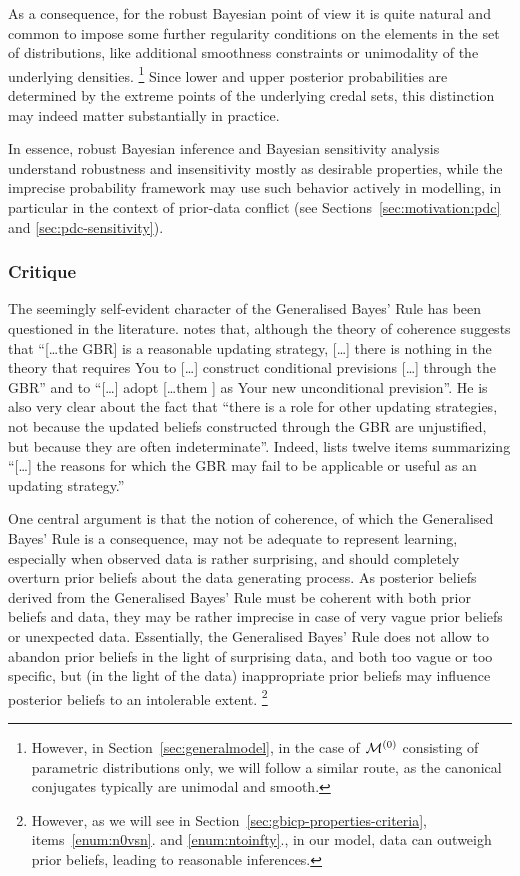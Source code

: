 As a consequence, for the robust Bayesian point of view it is quite natural and common
to impose some further regularity conditions on the elements in the set of distributions,
like additional smoothness constraints or unimodality of the underlying densities.%
\footnote{However, in Section~\ref{sec:generalmodel}, in the case of $\mathcal{M}^{(0)}$ consisting of parametric distributions only,
we will follow a similar route, as the canonical conjugates typically are unimodal and smooth.}
Since lower and upper posterior probabilities are determined by the extreme points of the underlying credal sets,
this distinction may indeed matter substantially in practice.

In essence, robust Bayesian inference and Bayesian sensitivity analysis
understand robustness and insensitivity mostly as desirable properties,
while the imprecise probability framework may use such behavior actively in modelling,
in particular in the context of prior-data conflict
(see Sections~\ref{sec:motivation:pdc} and \ref{sec:pdc-sensitivity}).

\subsubsection{Critique}
\label{sec:updating}

The seemingly self-evident character of the Generalised Bayes' Rule has been questioned in the literature.
\Textcite[p.~335]{1991:walley} notes that, although the theory of coherence suggests that
``[\ldots the GBR] is a reasonable updating strategy,
[\ldots] there is nothing in the theory that requires You to [\ldots] construct conditional previsions [\ldots] through the GBR''
and to ``[\ldots] adopt [\ldots them ] as Your new unconditional prevision''.
He is also very clear about the fact \parencite[see][p.~334]{1991:walley} that
``there is a role for other updating strategies, not because the updated beliefs constructed through the GBR are unjustified,
but because they are often indeterminate''.
Indeed, \textcite[\S 6.11.1]{1991:walley} lists twelve items summarizing
``[\ldots] the reasons for which the GBR may fail to be applicable or useful as an updating strategy.''

One central argument is that the notion of coherence, of which the Generalised Bayes' Rule is a consequence,
may not be adequate to represent learning, especially when observed data is rather surprising,
and should completely overturn prior beliefs about the data generating process.
As posterior beliefs derived from the Generalised Bayes' Rule must be coherent with both prior beliefs and data,
they may be rather imprecise in case of very vague prior beliefs or unexpected data.
Essentially, the Generalised Bayes' Rule does not allow to abandon prior beliefs in the light of surprising data,
and both too vague or too specific, but (in the light of the data) inappropriate prior beliefs
may influence posterior beliefs to an intolerable extent.%
\footnote{However, as we will see in Section~\ref{sec:gbicp-properties-criteria},
items~\ref{enum:n0vsn}. and \ref{enum:ntoinfty}.,
in our model, data can outweigh prior beliefs,
leading to reasonable inferences.}

